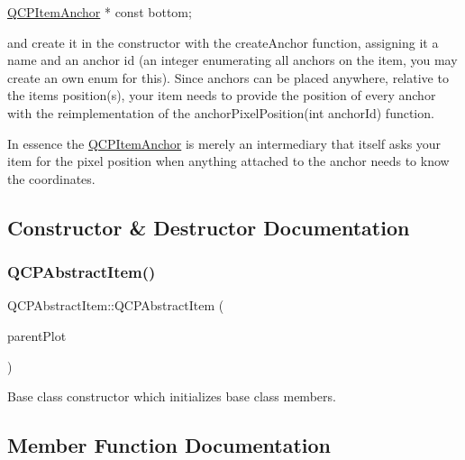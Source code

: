 \begin{DoxyCode}
\mbox{\hyperlink{class_q_c_p_item_anchor}{QCPItemAnchor}} * \textcolor{keyword}{const} bottom;
\end{DoxyCode}


and create it in the constructor with the create\+Anchor function, assigning it a name and an anchor id (an integer enumerating all anchors on the item, you may create an own enum for this). Since anchors can be placed anywhere, relative to the item\textquotesingle{}s position(s), your item needs to provide the position of every anchor with the reimplementation of the anchor\+Pixel\+Position(int anchor\+Id) function.

In essence the \mbox{\hyperlink{class_q_c_p_item_anchor}{Q\+C\+P\+Item\+Anchor}} is merely an intermediary that itself asks your item for the pixel position when anything attached to the anchor needs to know the coordinates. 

\subsection{Constructor \& Destructor Documentation}
\mbox{\label{class_q_c_p_abstract_item_a9922507d8b4503a1fe1ed0b1030e23b6}} 
\subsubsection{\texorpdfstring{Q\+C\+P\+Abstract\+Item()}{QCPAbstractItem()}}
{\footnotesize\ttfamily Q\+C\+P\+Abstract\+Item\+::\+Q\+C\+P\+Abstract\+Item (\begin{DoxyParamCaption}\item[{\mbox{\hyperlink{class_q_custom_plot}{Q\+Custom\+Plot}} $\ast$}]{parent\+Plot }\end{DoxyParamCaption})\hspace{0.3cm}{\ttfamily [explicit]}}

Base class constructor which initializes base class members. 

\subsection{Member Function Documentation}
\mbox{\label{class_q_c_p_abstract_item_a139c255ea8831642fac91748e29a5adb}} 

